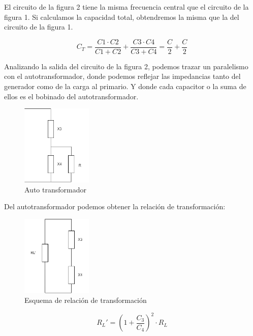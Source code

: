 El circuito de la figura 2 tiene la misma frecuencia central que el circuito de la figura 1. Si calculamos la capacidad total, obtendremos la misma que la del circuito de la figura 1.

\begin{equation}
    C_T = \frac{C1 \cdot C2}{C1 + C2} + \frac{C3 \cdot C4}{C3 + C4} = \frac{C}{2} + \frac{C}{2} 
\end{equation}

Analizando la salida del circuito de la figura 2, podemos trazar un paralelismo con el autotransformador, donde podemos reflejar las impedancias tanto del 
generador como de la carga al primario. Y donde cada capacitor o la suma de ellos es el bobinado del autotransformador.

\begin{figure}[h]
    \centering
    \includegraphics[width=0.3\textwidth]{Imagenes/Esquema_autotrafo.png}
    \caption{Auto transformador}
\end{figure}


Del autotransformador podemos obtener la relación de transformación:

\begin{figure}[h]
    \centering
    \includegraphics[width=0.3\textwidth]{Imagenes/relacion_transformacion.png}
    \caption{Esquema de relación de transformación}
\end{figure}

\begin{equation}
    R_L' = (1 + \frac{C_3}{C_4})^2 \cdot R_L 
\end{equation}

